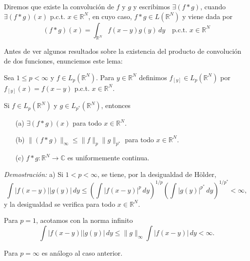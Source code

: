 \vspace{0.3cm}

Diremos que existe la convolución de $f$ y $g$ y escribimos $\exists(f * g)$, cuando $\exists(f * g)(x)$ p.c.t. $x \in \mathbb{R}^N$, en cuyo caso, $f * g \in L(\mathbb{R}^N)$ y viene dada por
\[
(f * g)(x) = \int_{\mathbb{R}^N} f(x - y)g(y) \, dy \quad \text{p.c.t. } x \in \mathbb{R}^N
\]

\vspace{0.5cm}

Antes de ver algunos resultados sobre la existencia del producto de convolución de dos funciones, enunciemos este lema:

\begin{lema} 
Sea $1 \leq p < \infty$ y $f \in L_p(\mathbb{R}^N)$. Para $y \in \mathbb{R}^N$ definimos $f_{[y]} \in L_p(\mathbb{R}^N)$ por $f_{[y]}(x) = f(x - y)$ p.c.t. $x \in \mathbb{R}^N$. \label{lema:lema} 
\end{lema}


\vspace{0.3cm}

\begin{proposicion}
Si $f \in L_p(\mathbb{R}^N)$ y $g \in L_{p^*}(\mathbb{R}^N)$, entonces

\begin{itemize}
    \item[(a)] $\exists(f * g)(x)$ para todo $x \in \mathbb{R}^N$.
    \item[(b)] $\|(f * g)\|_\infty \leq \|f\|_p \|g\|_{p^*}$ para todo $x \in \mathbb{R}^N$.
    \item[(c)] $f * g : \mathbb{R}^N \to \mathbb{C}$ es uniformemente continua.
\end{itemize}
\end{proposicion}

\textit{Demostración:}
\vspace{0.2cm}
a) Si $1 < p < \infty$, se tiene, por la desigualdad de Hölder,
\[
\int |f(x - y)||g(y)| \, dy \leq \left( \int |f(x - y)|^p \, dy \right)^{1/p} \left( \int |g(y)|^{p^*} \, dy \right)^{1/p^*} < \infty,
\]
y la desigualdad se verifica para todo $x \in \mathbb{R}^N$.

\vspace{0.2cm}

Para $p = 1$, acotamos con la norma infinito
\[
\int |f(x - y)||g(y)| \, dy \leq \|g\|_\infty \int |f(x - y)| \, dy < \infty.
\]

Para $p = \infty$ es análogo al caso anterior.

